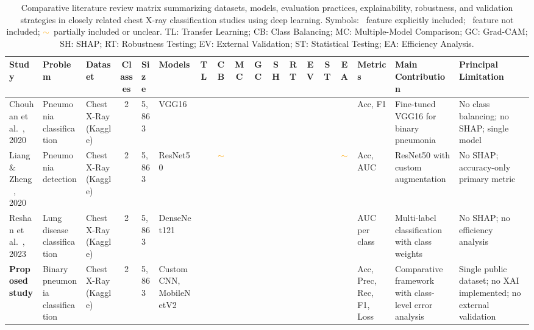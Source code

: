 \documentclass[preprint,12pt]{elsarticle}
\newcommand{\cmark}{\ding{51}}
\newcommand{\xmark}{\ding{55}}
\newcommand{\pmark}{\textcolor{orange}{$\sim$}}
\begin{document}
\begin{table}
\centering
\tiny
\caption{Comparative literature review matrix summarizing datasets,
models, evaluation practices, explainability, robustness, and
validation strategies in closely related chest X-ray classification
studies using deep learning. Symbols: \cmark~feature explicitly
included; \xmark~feature not included; \pmark~partially included or
unclear. TL: Transfer Learning; CB: Class Balancing; MC:
Multiple-Model Comparison; GC: Grad-CAM; SH: SHAP; RT: Robustness
Testing; EV: External Validation; ST: Statistical Testing; EA:
Efficiency Analysis.}
\label{tab:literature_matrix}
\begin{tabular}{p{1.5cm} p{1.7cm} p{1.3cm} c p{1.1cm} p{1.7cm}
                c c c c c c c c c p{1.6cm} p{2.3cm} p{2.3cm}}
\toprule
\textbf{Study} & \textbf{Problem} & \textbf{Dataset} &
\textbf{Classes} & \textbf{Size} & \textbf{Models} &
\textbf{TL} & \textbf{CB} & \textbf{MC} & \textbf{GC} &
\textbf{SH} & \textbf{RT} & \textbf{EV} & \textbf{ST} &
\textbf{EA} & \textbf{Metrics} & \textbf{Main Contribution} &
\textbf{Principal Limitation} \\
\midrule

Chouhan et al.\ \cite{chouhan2020}, 2020 &
  Pneumonia classification &
  Chest X-Ray (Kaggle) & 2 & 5{,}863 &
  VGG16 &
  \cmark & \xmark & \xmark & \cmark & \xmark &
  \xmark & \xmark & \xmark & \xmark &
  Acc, F1 &
  Fine-tuned VGG16 for binary pneumonia &
  No class balancing; no SHAP; single model \\

Liang \& Zheng\ \cite{liang2020}, 2020 &
  Pneumonia detection &
  Chest X-Ray (Kaggle) & 2 & 5{,}863 &
  ResNet50 &
  \cmark & \pmark & \xmark & \cmark & \xmark &
  \xmark & \xmark & \xmark & \pmark &
  Acc, AUC &
  ResNet50 with custom augmentation &
  No SHAP; accuracy-only primary metric \\

Reshan et al.\ \cite{reshan2023}, 2023 &
  Lung disease classification &
  Chest X-Ray (Kaggle) & 2 & 5{,}863 &
  DenseNet121 &
  \cmark & \cmark & \cmark & \cmark & \xmark &
  \xmark & \cmark & \xmark & \xmark &
  AUC per class &
  Multi-label classification with class weights &
  No SHAP; no efficiency analysis \\

\midrule
\textbf{Proposed study} &
  Binary pneumonia classification &
  Chest X-Ray (Kaggle) & 2 & 5{,}863 &
  Custom CNN, MobileNetV2 &
  \cmark & \cmark & \cmark & \xmark & \xmark &
  \xmark & \xmark & \xmark & \cmark &
  Acc, Prec, Rec, F1, Loss &
  Comparative framework with class-level error analysis &
  Single public dataset; no XAI implemented; no external validation \\

\bottomrule
\end{tabular}
\end{table}
\end{document}
